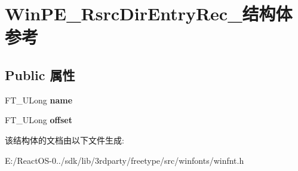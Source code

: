 \hypertarget{struct_win_p_e___rsrc_dir_entry_rec__}{}\section{Win\+P\+E\+\_\+\+Rsrc\+Dir\+Entry\+Rec\+\_\+结构体 参考}
\label{struct_win_p_e___rsrc_dir_entry_rec__}
\subsection*{Public 属性}
\begin{DoxyCompactItemize}
\item 
\mbox{\label{struct_win_p_e___rsrc_dir_entry_rec___a03d6c75df6b30b5f3d926687c711bc31}} 
F\+T\+\_\+\+U\+Long {\bfseries name}
\item 
\mbox{\label{struct_win_p_e___rsrc_dir_entry_rec___a788c2db384443d5eae531f59eba169e8}} 
F\+T\+\_\+\+U\+Long {\bfseries offset}
\end{DoxyCompactItemize}


该结构体的文档由以下文件生成\+:\begin{DoxyCompactItemize}
\item 
E\+:/\+React\+O\+S-\/0../sdk/lib/3rdparty/freetype/src/winfonts/winfnt.\+h\end{DoxyCompactItemize}
